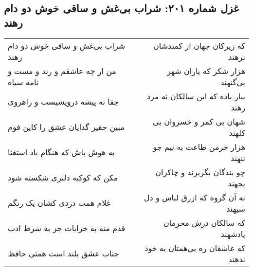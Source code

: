\begin{center}
\section*{غزل شماره ۲۰۱: شراب بی‌غش و ساقی خوش دو دام رهند}
\label{sec:sh201}
\begin{longtable}{l p{0.5cm} r}
شراب بی‌غش و ساقی خوش دو دام رهند
&&
که زیرکان جهان از کمندشان نرهند
\\
من ار چه عاشقم و رند و مست و نامه سیاه
&&
هزار شکر که یاران شهر بی‌گنهند
\\
جفا نه پیشه درویشیست و راهروی
&&
بیار باده که این سالکان نه مرد رهند
\\
مبین حقیر گدایان عشق را کاین قوم
&&
شهان بی کمر و خسروان بی کلهند
\\
به هوش باش که هنگام باد استغنا
&&
هزار خرمن طاعت به نیم جو ننهند
\\
مکن که کوکبه دلبری شکسته شود
&&
چو بندگان بگریزند و چاکران بجهند
\\
غلام همت دردی کشان یک رنگم
&&
نه آن گروه که ازرق لباس و دل سیهند
\\
قدم منه به خرابات جز به شرط ادب
&&
که سالکان درش محرمان پادشهند
\\
جناب عشق بلند است همتی حافظ
&&
که عاشقان ره بی‌همتان به خود ندهند
\\
\end{longtable}
\end{center}
